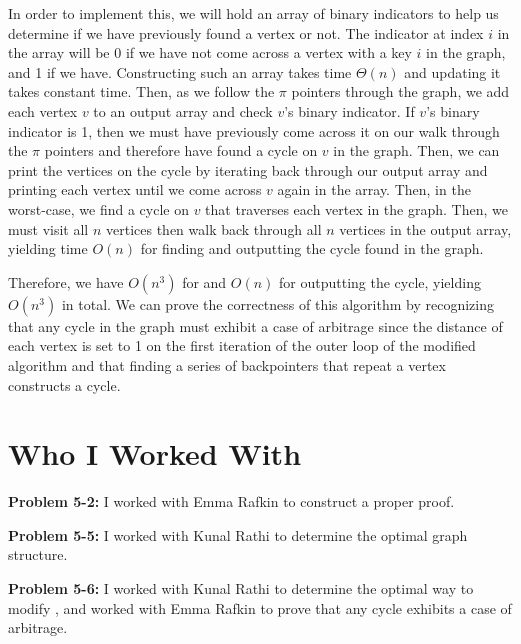 \documentclass[11pt]{article}
\begin{document}
In order to implement this, we will hold an array of binary indicators to help us determine if we have previously found a vertex or not. The indicator at index $i$ in the array will be 0 if we have not come across a vertex with a key $i$ in the graph, and 1 if we have. Constructing such an array takes time $\Theta(n)$ and updating it takes constant time. Then, as we follow the $\pi$ pointers through the graph, we add each vertex $v$ to an output array and check $v$'s binary indicator. If $v$'s binary indicator is 1, then we must have previously come across it on our walk through the $\pi$ pointers and therefore have found a cycle on $v$ in the graph. Then, we can print the vertices on the cycle by iterating back through our output array and printing each vertex until we come across $v$ again in the array. Then, in the worst-case, we find a cycle on $v$ that traverses each vertex in the graph. Then, we must visit all $n$ vertices then walk back through all $n$ vertices in the output array, yielding time $O(n)$ for finding and outputting the cycle found in the graph.

Therefore, we have $O(n^3)$ for  and $O(n)$ for outputting the cycle, yielding $O(n^3)$ in total. We can prove the correctness of this algorithm by recognizing that any cycle in the graph must exhibit a case of arbitrage since the distance of each vertex is set to 1 on the first iteration of the outer loop of the modified algorithm and that finding a series of backpointers that repeat a vertex constructs a cycle.


\newpage

\section{Who I Worked With}

\textbf{Problem 5-2:} I worked with Emma Rafkin to construct a proper proof.

\textbf{Problem 5-5:} I worked with Kunal Rathi to determine the optimal graph structure.

\textbf{Problem 5-6:} I worked with Kunal Rathi to determine the optimal way to modify , and worked with Emma Rafkin to prove that any cycle exhibits a case of arbitrage.
\end{document}
